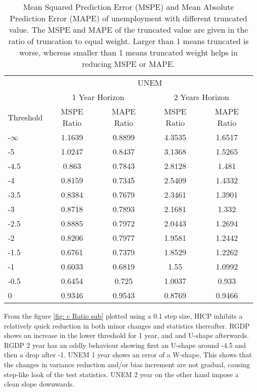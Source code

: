 \documentclass[11pt]{article}
\begin{document}
\begin{table}[!h]
	\centering
	\caption{Mean Squared Prediction Error (MSPE) and Mean Absolute Prediction Error (MAPE) of unemployment with different truncated value. The MSPE and MAPE of the truncated value are given in the ratio of truncation to equal weight. Larger than 1 means truncated is worse, whereas smaller than 1 means truncated weight helps in reducing MSPE or MAPE.}
	\label{tab: c MSPE UNEM}
	\begin{tabular}{lcccc}
		\hline\hline
		&                        \multicolumn{4}{c}{UNEM}                         \\
		\cmidrule(lr){2-5}                              & \multicolumn{2}{c}{1 Year Horizon} & \multicolumn{2}{c}{2 Years Horizon} \\
		\cmidrule(lr){2-3} \cmidrule(lr){4-5}
		Threshold & MSPE Ratio &    MAPE Ratio    & MSPE Ratio &    MAPE Ratio    \\ \hline
-$\infty$ & 1.1639 & 0.8899 & 4.3535 & 1.6517\\ 
-5 & 1.0247 & 0.8437 & 3.1368 & 1.5265\\ 
-4.5 & 0.863 & 0.7843 & 2.8128 & 1.481\\ 
-4 & 0.8159 & 0.7345 & 2.5409 & 1.4332\\ 
-3.5 & 0.8384 & 0.7679 & 2.3461 & 1.3901\\ 
-3 & 0.8718 & 0.7893 & 2.1681 & 1.332\\ 
-2.5 & 0.8885 & 0.7972 & 2.0443 & 1.2694\\ 
-2 & 0.8206 & 0.7977 & 1.9581 & 1.2442\\ 
-1.5 & 0.6761 & 0.7379 & 1.8529 & 1.2262\\ 
-1 & 0.6033 & 0.6819 & 1.55 & 1.0992\\ 
-0.5 & 0.6454 & 0.725 & 1.0037 & 0.933\\ 
0 & 0.9346 & 0.9543 & 0.8769 & 0.9466\\ 
		\hline\hline
	\end{tabular}
\end{table}

From the figure \ref{fig: c Ratio sub} plotted using a 0.1 step size, HICP inhibits a relatively quick reduction in both minor changes and statistics thereafter. RGDP shows an increase in the lower threshold for 1 year, and and U-shape afterwards. RGDP 2 year has an oddly behaviour showing first an U-shape around -4.5 and then a drop after -1. UNEM 1 year shows an error of a W-shape, This shows that the changes in variance reduction and/or bias increment are not gradual, causing step-like look of the test statistics. UNEM 2 year on the other hand impose a clean slope downwards.
\end{document}
